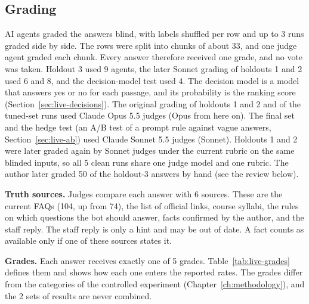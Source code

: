 \subsection{Grading}

AI agents graded the answers blind, with labels shuffled per row and up to 3 runs graded side by side. The rows were split into chunks of about 33, and one judge agent graded each chunk. Every answer therefore received one grade, and no vote was taken. Holdout 3 used 9 agents, the later Sonnet grading of holdouts 1 and 2 used 6 and 8, and the decision-model test used 4. The decision model is a model that answers yes or no for each passage, and its probability is the ranking score (Section~\ref{sec:live-decisions}). The original grading of holdouts 1 and 2 and of the tuned-set runs used Claude Opus 5.5 judges (Opus from here on). The final set and the hedge test (an A/B test of a prompt rule against vague answers, Section~\ref{sec:live-ab}) used Claude Sonnet 5.5 judges (Sonnet). Holdouts 1 and 2 were later graded again by Sonnet judges under the current rubric on the same blinded inputs, so all 5 clean runs share one judge model and one rubric. The author later graded 50 of the holdout-3 answers by hand (see the review below).

\textbf{Truth sources.} Judges compare each answer with 6 sources. These are the current FAQs (104, up from 74), the list of official links, course syllabi, the rules on which questions the bot should answer, facts confirmed by the author, and the staff reply. The staff reply is only a hint and may be out of date. A fact counts as available only if one of these sources states it.

\textbf{Grades.} Each answer receives exactly one of 5 grades. Table~\ref{tab:live-grades} defines them and shows how each one enters the reported rates. The grades differ from the categories of the controlled experiment (Chapter~\ref{ch:methodology}), and the 2 sets of results are never combined.

